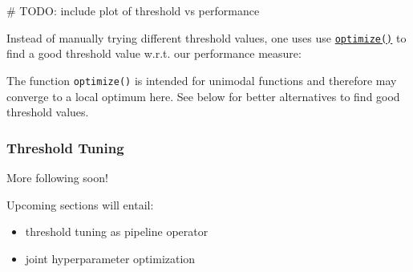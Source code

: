 \documentclass[]{article}
\makeatletter
\newenvironment{Shaded}{}{}
\newcommand{\AlertTok}[1]{\textcolor[rgb]{1.00,0.00,0.00}{#1}}
\newcommand{\CommentTok}[1]{\textcolor[rgb]{0.00,0.50,0.00}{#1}}
\newcommand{\ControlFlowTok}[1]{\textcolor[rgb]{0.00,0.00,1.00}{#1}}
\newcommand{\DecValTok}[1]{#1}
\newcommand{\FloatTok}[1]{#1}
\newcommand{\KeywordTok}[1]{\textcolor[rgb]{0.00,0.00,1.00}{#1}}
\newcommand{\NormalTok}[1]{#1}
\newcommand{\OperatorTok}[1]{#1}
\newcommand{\StringTok}[1]{\textcolor[rgb]{0.00,0.50,0.50}{#1}}
\providecommand{\tightlist}{%
  \setlength{\itemsep}{0pt}\setlength{\parskip}{0pt}}
\newenvironment{kframe}{%
\medskip{}
\setlength{\fboxsep}{.8em}
 \def\at@end@of@kframe{}%
 \ifinner\ifhmode%
  \def\at@end@of@kframe{\end{minipage}}%
  \begin{minipage}{\columnwidth}%
 \fi\fi%
 \def\FrameCommand##1{\hskip\@totalleftmargin \hskip-\fboxsep
 \colorbox{shadecolor}{##1}\hskip-\fboxsep
     \hskip-\linewidth \hskip-\@totalleftmargin \hskip\columnwidth}%
 \MakeFramed {\advance\hsize-\width
   \@totalleftmargin\z@ \linewidth\hsize
   \@setminipage}}%
 {\par\unskip\endMakeFramed%
 \at@end@of@kframe}
\newenvironment{rmdblock}[1]
  {
  \begin{itemize}
  \renewcommand{\labelitemi}{
    \raisebox{-.7\height}[0pt][0pt]{
      {\setkeys{Gin}{width=3em,keepaspectratio}\texttt{[image: images/\#1]}}
    }
  }
  \setlength{\fboxsep}{1em}
  \begin{kframe}
  \item
  }
  {
  \end{kframe}
  \end{itemize}
  }
\newenvironment{warning}
  {\begin{rmdblock}{warning}}
  {\end{rmdblock}}
\renewenvironment{Shaded} {\begin{snugshade}\small} {\end{snugshade}}
\makeatother
\begin{document}
\begin{Shaded}
\begin{Highlighting}[]
\CommentTok{# }\AlertTok{TODO}\CommentTok{: include plot of threshold vs performance}
\end{Highlighting}
\end{Shaded}

Instead of manually trying different threshold values, one uses use \href{https://www.rdocumentation.org/packages/stats/topics/optimize}{\texttt{optimize()}} to find a good threshold value w.r.t. our performance measure:

\begin{Shaded}
\end{Shaded}

\begin{warning}
The function \texttt{optimize()} is intended for unimodal functions and
therefore may converge to a local optimum here. See below for better
alternatives to find good threshold values.
\end{warning}

\hypertarget{threshold-tuning-1}{%
\subsubsection{Threshold Tuning}\label{threshold-tuning-1}}

More following soon!

Upcoming sections will entail:

\begin{itemize}
\tightlist
\item
  threshold tuning as pipeline operator
\item
  joint hyperparameter optimization
\end{itemize}
\end{document}

